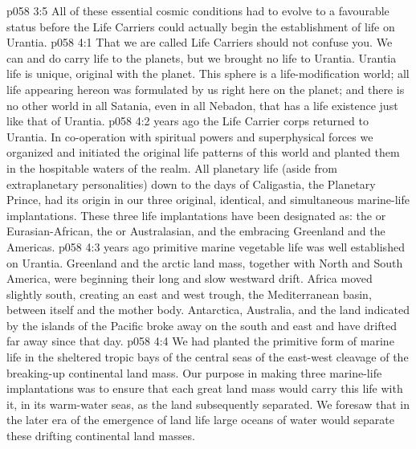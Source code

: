\vs p058 3:5 \pc All of these essential cosmic conditions had to evolve to a favourable status before the Life Carriers could actually begin the establishment of life on Urantia.
\vs p058 4:1 That we are called Life Carriers should not confuse you. We can and do carry life to the planets, but we brought no life to Urantia. Urantia life is unique, original with the planet. This sphere is a life\hyp{}modification world; all life appearing hereon was formulated by us right here on the planet; and there is no other world in all Satania, even in all Nebadon, that has a life existence just like that of Urantia.
\vs p058 4:2 \pc {} years ago the Life Carrier corps returned to Urantia. In co\hyp{}operation with spiritual powers and superphysical forces we organized and initiated the original life patterns of this world and planted them in the hospitable waters of the realm. All planetary life (aside from extraplanetary personalities) down to the days of Caligastia, the Planetary Prince, had its origin in our three original, identical, and simultaneous marine\hyp{}life implantations. These three life implantations have been designated as: the  or Eurasian\hyp{}African, the  or Australasian, and the  embracing Greenland and the Americas.
\vs p058 4:3 \pc {} years ago primitive marine vegetable life was well established on Urantia. Greenland and the arctic land mass, together with North and South America, were beginning their long and slow westward drift. Africa moved slightly south, creating an east and west trough, the Mediterranean basin, between itself and the mother body. Antarctica, Australia, and the land indicated by the islands of the Pacific broke away on the south and east and have drifted far away since that day.
\vs p058 4:4 We had planted the primitive form of marine life in the sheltered tropic bays of the central seas of the east\hyp{}west cleavage of the breaking\hyp{}up continental land mass. Our purpose in making three marine\hyp{}life implantations was to ensure that each great land mass would carry this life with it, in its warm\hyp{}water seas, as the land subsequently separated. We foresaw that in the later era of the emergence of land life large oceans of water would separate these drifting continental land masses.
